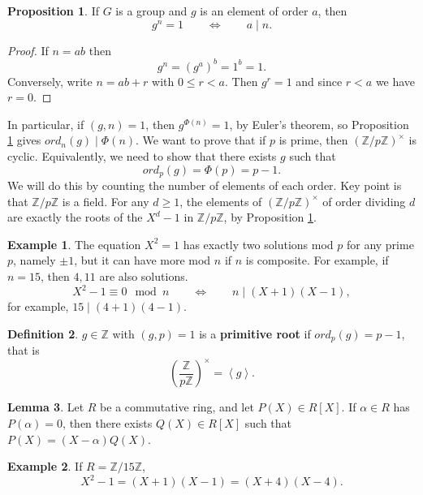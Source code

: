 \documentclass{article}
\newcommand{\Z}{\mathbb{Z}}
\newcommand{\rb}[1]{\left( #1 \right)}
\renewcommand{\sb}[1]{\left[ #1 \right]}
\newcommand{\ab}[1]{\left\langle #1 \right\rangle}
\newcommand{\Unit}[1]{\rb{\dfrac{\Z}{#1\Z}}^\times}
\newcommand{\unit}[1]{\rb{\Z / #1\Z}^\times}
\theoremstyle{definition}\newtheorem{definition}{Definition}
\theoremstyle{definition}\newtheorem{remark}[definition]{Remark}
\theoremstyle{definition}\newtheorem*{example}{Example}
\theoremstyle{definition}\newtheorem*{note}{Note}
\newtheorem{proposition}[definition]{Proposition}
\newtheorem{lemma}[definition]{Lemma}
\begin{document}
\begin{proposition}
\label{prop:19}
If $ G $ is a group and $ g $ is an element of order $ a $, then
$$ g^n = 1 \qquad \iff \qquad a \mid n. $$
\end{proposition}

\begin{proof}
If $ n = ab $ then
$$ g^n = \rb{g^a}^b = 1^b = 1. $$
Conversely, write $ n = ab + r $ with $ 0 \le r < a $. Then $ g^r = 1 $ and since $ r < a $ we have $ r = 0 $.
\end{proof}

In particular, if $ \rb{g, n} = 1 $, then $ g^{\Phi\rb{n}} = 1 $, by Euler's theorem, so Proposition \ref{prop:19} gives $ ord_n\rb{g} \mid \Phi\rb{n} $. We want to prove that if $ p $ is prime, then $ \unit{p} $ is cyclic. Equivalently, we need to show that there exists $ g $ such that
$$ ord_p\rb{g} = \Phi\rb{p} = p - 1. $$
We will do this by counting the number of elements of each order. Key point is that $ \Z / p\Z $ is a field. For any $ d \ge 1 $, the elements of $ \unit{p} $ of order dividing $ d $ are exactly the roots of the $ X^d - 1 $ in $ \Z / p\Z $, by Proposition \ref{prop:19}.

\begin{example}
The equation $ X^2 = 1 $ has exactly two solutions mod $ p $ for any prime $ p $, namely $ \pm 1 $, but it can have more mod $ n $ if $ n $ is composite. For example, if $ n = 15 $, then $ 4, 11 $ are also solutions.
$$ X^2 - 1 \equiv 0 \mod n \qquad \iff \qquad n \mid \rb{X + 1}\rb{X - 1}, $$
for example, $ 15 \mid \rb{4 + 1}\rb{4 - 1} $.
\end{example}

\begin{definition}
$ g \in \Z $ with $ \rb{g, p} = 1 $ is a \textbf{primitive root} if $ ord_p\rb{g} = p - 1 $, that is
$$ \Unit{p} = \ab{g}. $$
\end{definition}

\begin{lemma}
\label{lem:21}
Let $ R $ be a commutative ring, and let $ P\rb{X} \in R\sb{X} $. If $ \alpha \in R $ has $ P\rb{\alpha} = 0 $, then there exists $ Q\rb{X} \in R\sb{X} $ such that $ P\rb{X} = \rb{X - \alpha}Q\rb{X} $.
\end{lemma}

\begin{example}
If $ R = \Z / 15\Z $,
$$ X^2 - 1 = \rb{X + 1}\rb{X - 1} = \rb{X + 4}\rb{X - 4}. $$
\end{example}
\end{document}
